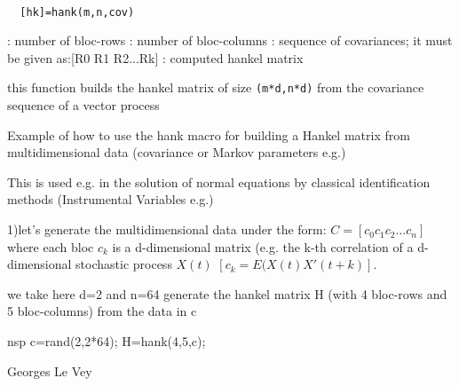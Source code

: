 \begin{mandesc}
   \\ %
\end{mandesc}
\begin{calling_sequence}
\begin{verbatim}
  [hk]=hank(m,n,cov)  
\end{verbatim}
\end{calling_sequence}
\begin{parameters}
  \begin{varlist}
    : number of bloc-rows
    : number of bloc-columns
    : sequence of covariances; it must be given as:[R0 R1 R2...Rk]
    : computed hankel matrix
  \end{varlist}
\end{parameters}
\begin{mandescription}
  this function builds the hankel matrix of size \verb!(m*d,n*d)!
  from the covariance sequence of a vector process
\end{mandescription}
\begin{examples}
   Example of how to use the hank macro for 
   building a Hankel matrix from multidimensional 
   data (covariance or Markov parameters e.g.)
    
   This is used e.g. in the solution of normal equations
   by classical identification methods (Instrumental Variables e.g.)
    
   1)let's generate the multidimensional data under the form:
   $C=[c_0 c_1 c_2 \ldots c_n]$
   where each bloc $c_k$ is a d-dimensional matrix (e.g. the k-th correlation 
   of a d-dimensional stochastic process $X(t)$ 
   $[c_k = E(X(t) X'(t+k)]$.
    
   we take here d=2 and n=64 
   generate the hankel matrix H (with 4 bloc-rows and 5 bloc-columns)
   from the data in c
   \begin{mintednsp}{nsp}
     c=rand(2,2*64);
     H=hank(4,5,c);
   \end{mintednsp}
\end{examples}
\begin{manseealso}
\end{manseealso}
\begin{authors}
  Georges Le Vey
\end{authors}

